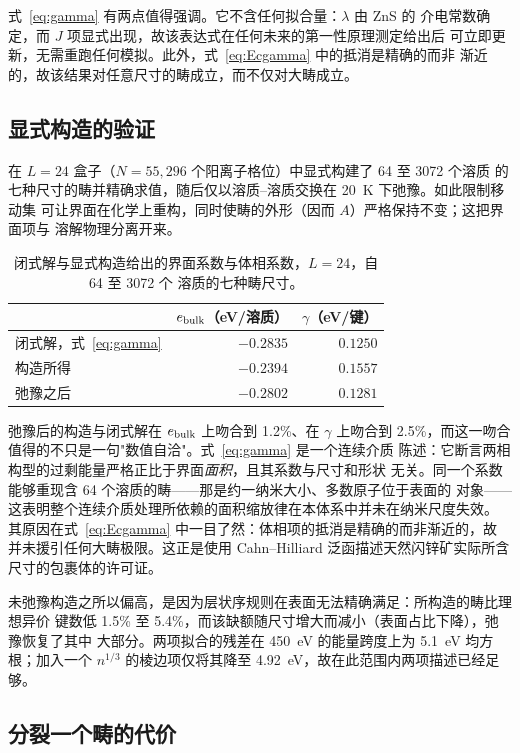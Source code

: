 \documentclass[11pt,a4paper]{ctexart}
\begin{document}
式~\eqref{eq:gamma} 有两点值得强调。它不含任何拟合量：$\lambda$ 由 ZnS 的
介电常数确定，而 $J$ 项显式出现，故该表达式在任何未来的第一性原理测定给出后
可立即更新，无需重跑任何模拟。此外，式~\eqref{eq:Ecgamma} 中的抵消是精确的而非
渐近的，故该结果对任意尺寸的畴成立，而不仅对大畴成立。

\subsection{显式构造的验证}
\label{sec:gammaverify}

在 $L = 24$ 盒子（$N = 55{,}296$ 个阳离子格位）中显式构建了 64 至 3072 个溶质
的七种尺寸的畴并精确求值，随后仅以溶质--溶质交换在 20~K 下弛豫。如此限制移动集
可让界面在化学上重构，同时使畴的外形（因而 $A$）严格保持不变；这把界面项与
溶解物理分离开来。

\begin{table}[htbp]
\centering
\caption{闭式解与显式构造给出的界面系数与体相系数，$L = 24$，自 64 至 3072 个
溶质的七种畴尺寸。}
\label{tab:gamma}
\small
\begin{tabular}{lrr}
\toprule
& $e_{\rm bulk}$（eV/溶质） & $\gamma$（eV/键） \\
\midrule
闭式解，式~\eqref{eq:gamma} & $-0.2835$ & $0.1250$ \\
构造所得 & $-0.2394$ & $0.1557$ \\
弛豫之后 & $-0.2802$ & $0.1281$ \\
\bottomrule
\end{tabular}
\end{table}

弛豫后的构造与闭式解在 $e_{\rm bulk}$ 上吻合到 1.2\%、在 $\gamma$ 上吻合到
2.5\%，而这一吻合值得的不只是一句"数值自洽"。式~\eqref{eq:gamma} 是一个连续介质
陈述：它断言两相构型的过剩能量严格正比于界面\emph{面积}，且其系数与尺寸和形状
无关。同一个系数能够重现含 64 个溶质的畴——那是约一纳米大小、多数原子位于表面的
对象——这表明整个连续介质处理所依赖的面积缩放律在本体系中并未在纳米尺度失效。
其原因在式~\eqref{eq:Ecgamma} 中一目了然：体相项的抵消是精确的而非渐近的，故
并未援引任何大畴极限。这正是使用 Cahn--Hilliard 泛函描述天然闪锌矿实际所含
尺寸的包裹体的许可证。

未弛豫构造之所以偏高，是因为层状序规则在表面无法精确满足：所构造的畴比理想异价
键数低 1.5\% 至 5.4\%，而该缺额随尺寸增大而减小（表面占比下降），弛豫恢复了其中
大部分。两项拟合的残差在 450~eV 的能量跨度上为 5.1~eV 均方根；加入一个
$n^{1/3}$ 的棱边项仅将其降至 4.92~eV，故在此范围内两项描述已经足够。

\subsection{分裂一个畴的代价}
\label{sec:splitting}
\end{document}
